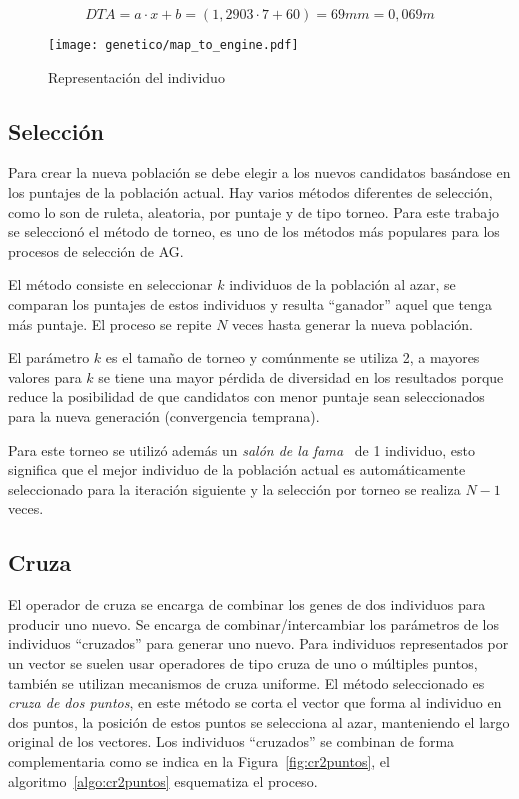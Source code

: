 \begin{equation*}
  DTA = a\cdot x + b = (1,2903\cdot 7 + 60) = 69 mm = 0,069 m
\end{equation*}


\begin{figure}[ht]
  \centering
  \texttt{[image: genetico/map\_to\_engine.pdf]}
  \caption{Representación del individuo}\label{fig:pop_bit}
\end{figure}


\subsection{Selección}

Para crear la nueva población se debe elegir a los nuevos candidatos basándose
en los puntajes de la población actual.
%
Hay varios métodos diferentes de selección, como lo son de ruleta, aleatoria,
por puntaje y de tipo torneo.
%
Para este trabajo se seleccionó el método de torneo, es uno de los métodos más
populares para los procesos de selección de AG.

El método consiste en seleccionar $k$ individuos de la población al azar, se
comparan los puntajes de estos individuos y resulta ``ganador'' aquel que tenga
más puntaje.
%
El proceso se repite $N$ veces hasta generar la nueva población.

El parámetro $k$ es el tamaño de torneo y comúnmente se utiliza
2\parencite{oladele}, a mayores valores para $k$ se tiene una mayor pérdida de
diversidad en los resultados\parencite{blickle} porque reduce la posibilidad de
que candidatos con menor puntaje sean seleccionados para la nueva generación
(convergencia temprana).

Para este torneo se utilizó además un \emph{salón de la
fama}~\parencite{wirsansky} de 1 individuo, esto significa que el mejor
individuo de la población actual es automáticamente seleccionado para la
iteración siguiente y la selección por torneo se realiza $N-1$ veces.

\subsection{Cruza}
%
El operador de cruza se encarga de combinar los genes  de dos individuos para
producir uno nuevo.
%
Se encarga de combinar/intercambiar los parámetros de los individuos
``cruzados'' para generar uno nuevo.
%
Para individuos representados por un vector se suelen usar operadores de tipo
cruza de uno o múltiples puntos, también se utilizan mecanismos de cruza
uniforme.
%
El método seleccionado es \emph{cruza de dos puntos}, en este método se corta el
vector que forma al individuo en dos puntos, la posición de estos puntos se
selecciona al azar, manteniendo el largo original de los vectores.
%
Los individuos ``cruzados'' se combinan de forma complementaria como se indica
en la Figura~\ref{fig:cr2puntos}, el algoritmo~\ref{algo:cr2puntos} esquematiza
el proceso.


